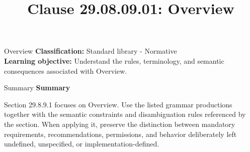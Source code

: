 \documentclass[10pt,letterpaper]{article}
\title{Clause 29.08.09.01: Overview}
\author{}
\date{}
\begin{document}
\maketitle
\begin{CornellOverviewBox}{Overview}
\textbf{Classification:} Standard library - Normative\\[2pt]
\textbf{Learning objective:} Understand the rules, terminology, and semantic consequences associated with Overview.
\end{CornellOverviewBox}\begin{CornellSummaryBox}{Summary}
{\sffamily\bfseries\color{Accent} Summary}\par\vspace{3pt}Section 29.8.9.1 focuses on Overview. Use the listed grammar productions together with the semantic constraints and disambiguation rules referenced by the section. When applying it, preserve the distinction between mandatory requirements, recommendations, permissions, and behavior deliberately left undefined, unspecified, or implementation-defined.
\end{CornellSummaryBox}
\end{document}

